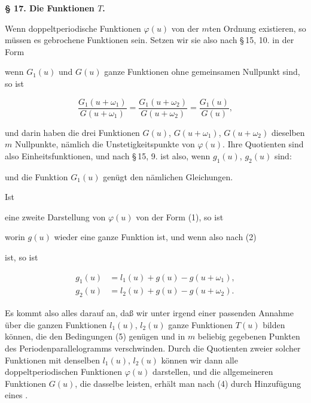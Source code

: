
\begin{center}
\textbf{§ 17. Die Funktionen $T$.}
\end{center}

Wenn doppeltperiodische Funktionen $\varphi(u)$ von der $m$ten Ordnung existieren, so müssen es gebrochene Funktionen sein. Setzen wir sie also nach \S\,15, 10. in der Form


wenn $G_1(u)$ und $G(u)$ ganze Funktionen ohne gemeinsamen Nullpunkt sind, so ist

\[
\frac{G_1(u+\omega_1)}{G(u+\omega_1)} = \frac{G_1(u+\omega_2)}{G(u+\omega_2)} = \frac{G_1(u)}{G(u)},
\]

und darin haben die drei Funktionen $G(u)$, $G(u+\omega_1)$, $G(u+\omega_2)$ dieselben $m$ Nullpunkte, nämlich die Unstetigkeitspunkte von $\varphi(u)$. Ihre Quotienten sind also Einheitsfunktionen, und nach \S\,15, 9. ist also, wenn $g_1(u)$, $g_2(u)$  sind:


und die Funktion $G_1(u)$ genügt den nämlichen Gleichungen.

Ist


eine zweite Darstellung von $\varphi(u)$ von der Form (1), so ist


worin $g(u)$ wieder eine ganze Funktion ist, und wenn also nach (2)


ist, so ist

\[
\begin{aligned}
g_1(u) &= l_1(u) + g(u) - g(u+\omega_1),\\
g_2(u) &= l_2(u) + g(u) - g(u+\omega_2).
\end{aligned}
\]

Es kommt also alles darauf an, daß wir unter irgend einer passenden Annahme über die ganzen Funktionen $l_1(u)$, $l_2(u)$ ganze Funktionen $T(u)$ bilden können, die den Bedingungen (5) genügen und in $m$ beliebig gegebenen Punkten des Periodenparallelogramms verschwinden. Durch die Quotienten zweier solcher Funktionen mit denselben $l_1(u)$, $l_2(u)$ können wir dann alle doppeltperiodischen Funktionen $\varphi(u)$ darstellen, und die allgemeineren Funktionen $G(u)$, die dasselbe leisten, erhält man nach (4) durch Hinzufügung eines .
